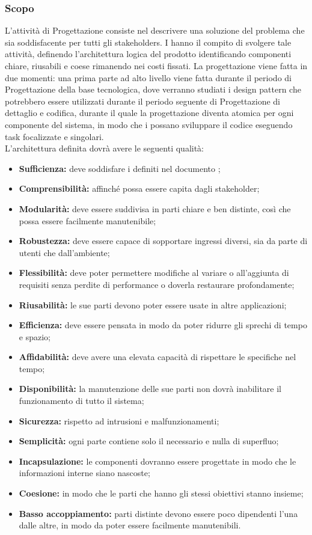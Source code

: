 \documentclass[NormeDiProgetto.tex]{subfiles}
\begin{document}
\subsubsection{Scopo}
L'attività di Progettazione consiste nel descrivere una soluzione del problema
che sia soddisfacente per tutti gli stakeholders.
I \progi hanno il compito di svolgere tale attività, definendo l'architettura logica del prodotto identificando componenti chiare, riusabili e coese rimanendo nei costi fissati. La progettazione viene fatta in due momenti: una prima parte ad alto livello viene fatta durante il periodo di Progettazione della base tecnologica, dove verranno studiati i design pattern che potrebbero essere utilizzati durante il periodo seguente di Progettazione di dettaglio e codifica, durante il quale la progettazione diventa atomica per ogni componente del sistema, in modo che i \progri possano sviluppare il codice eseguendo task focalizzate e singolari.\\
L'architettura definita dovrà avere le seguenti qualità:
\begin{itemize}
	\item \textbf{Sufficienza:} deve soddisfare i  definiti nel documento \adr;
	\item \textbf{Comprensibilità:} affinché possa essere capita dagli stakeholder;
	\item \textbf{Modularità:} deve essere suddivisa in parti chiare e ben distinte, così che possa essere facilmente manutenibile;
	\item \textbf{Robustezza:} deve essere capace di sopportare ingressi diversi, sia da parte di utenti che dall'ambiente;
	\item \textbf{Flessibilità:} deve poter permettere modifiche al variare o all'aggiunta di requisiti senza perdite di performance o doverla restaurare profondamente;
	\item \textbf{Riusabilità:} le sue parti devono poter essere usate in altre applicazioni;
	\item \textbf{Efficienza:} deve essere pensata in modo da poter ridurre gli sprechi di tempo e spazio;
	\item \textbf{Affidabilità:} deve avere una elevata capacità di rispettare le specifiche nel tempo;
	\item \textbf{Disponibilità:} la manutenzione delle sue parti non dovrà inabilitare il funzionamento di tutto il sistema;
	\item \textbf{Sicurezza:} rispetto ad intrusioni e malfunzionamenti;
	\item \textbf{Semplicità:} ogni parte contiene solo il necessario e nulla di superfluo;
	\item \textbf{Incapsulazione:} le componenti dovranno essere progettate in modo che le informazioni interne siano nascoste;
	\item \textbf{Coesione:} in modo che le parti che hanno gli stessi obiettivi stanno insieme;
	\item \textbf{Basso accoppiamento:} parti distinte devono essere poco dipendenti l'una dalle altre, in modo da poter essere facilmente manutenibili.
\end{itemize}
\end{document}
